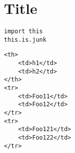\section{Title}\label{title}

\begin{verbatim}
import this
this.is.junk
\end{verbatim}

\begin{verbatim}
<th>
    <td>h1</td>
    <td>h2</td>
</th>
<tr>
    <td>Foo11</td>
    <td>Foo12</td>
</tr>
<tr>
    <td>Foo121</td>
    <td>Foo122</td>
</tr>
\end{verbatim}
